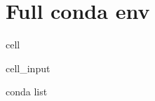 \documentclass[letterpaper,table,10pt,english]{jupyterBook}
\begin{document}
\section{Full conda env}
\label{\detokenize{tests/build_versions_checks:full-conda-env}}
\begin{sphinxuseclass}{cell}\begin{sphinxVerbatimInput}

\begin{sphinxuseclass}{cell_input}
\begin{sphinxVerbatim}[commandchars=\\\{\}]
conda list
\end{sphinxVerbatim}

\end{sphinxuseclass}\end{sphinxVerbatimInput}
\begin{sphinxVerbatimOutput}


\end{sphinxVerbatimOutput}
\end{sphinxuseclass}
\end{document}
